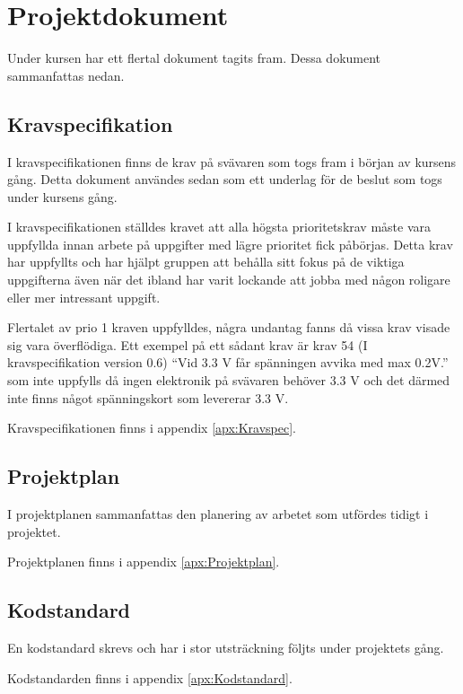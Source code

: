 \section{Projektdokument}
Under kursen har ett flertal dokument tagits fram. Dessa dokument sammanfattas nedan.
\subsection{Kravspecifikation}
I kravspecifikationen finns de krav på svävaren som togs fram i början av kursens gång. 
Detta dokument användes sedan som ett underlag för de beslut som togs under kursens gång.

I kravspecifikationen ställdes kravet att alla högsta prioritetskrav måste vara uppfyllda innan 
arbete på uppgifter med lägre prioritet fick påbörjas. Detta krav har uppfyllts och har hjälpt 
gruppen att behålla sitt fokus på de viktiga uppgifterna även när det ibland har varit lockande 
att jobba med någon roligare eller mer intressant uppgift.

Flertalet av prio 1 kraven uppfylldes, några undantag fanns då vissa krav visade sig vara överflödiga.
Ett exempel på ett sådant krav är krav 54 (I kravspecifikation version 0.6) ``Vid 3.3 V får spänningen
avvika med max 0.2V.'' som inte uppfylls då ingen elektronik på svävaren behöver 3.3 V och det därmed inte 
finns något spänningskort som levererar 3.3 V.

Kravspecifikationen finns i appendix \ref{apx:Kravspec}.
\subsection{Projektplan}
I projektplanen sammanfattas den planering av arbetet som utfördes tidigt i projektet.

Projektplanen finns i appendix \ref{apx:Projektplan}.
\subsection{Kodstandard}
En kodstandard skrevs och har i stor utsträckning följts under projektets gång.

Kodstandarden finns i appendix \ref{apx:Kodstandard}.